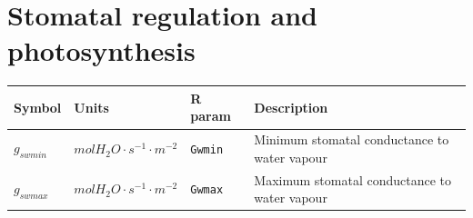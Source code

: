 \documentclass[]{book}
\begin{document}
\section{Stomatal regulation and
photosynthesis}\label{stomatal-regulation-and-photosynthesis-1}

\begin{longtable}[]{@{}llll@{}}
\toprule
\begin{minipage}[b]{0.11\columnwidth}\raggedright\strut
Symbol\strut
\end{minipage} & \begin{minipage}[b]{0.10\columnwidth}\raggedright\strut
Units\strut
\end{minipage} & \begin{minipage}[b]{0.12\columnwidth}\raggedright\strut
R param\strut
\end{minipage} & \begin{minipage}[b]{0.45\columnwidth}\raggedright\strut
Description\strut
\end{minipage}\tabularnewline
\midrule
\endhead
\begin{minipage}[t]{0.11\columnwidth}\raggedright\strut
\(g_{swmin}\)\strut
\end{minipage} & \begin{minipage}[t]{0.10\columnwidth}\raggedright\strut
\(mol H_2O \cdot s^{-1} \cdot m^{-2}\)\strut
\end{minipage} & \begin{minipage}[t]{0.12\columnwidth}\raggedright\strut
\texttt{Gwmin}\strut
\end{minipage} & \begin{minipage}[t]{0.45\columnwidth}\raggedright\strut
Minimum stomatal conductance to water vapour\strut
\end{minipage}\tabularnewline
\begin{minipage}[t]{0.11\columnwidth}\raggedright\strut
\(g_{swmax}\)\strut
\end{minipage} & \begin{minipage}[t]{0.10\columnwidth}\raggedright\strut
\(mol H_2O \cdot s^{-1} \cdot m^{-2}\)\strut
\end{minipage} & \begin{minipage}[t]{0.12\columnwidth}\raggedright\strut
\texttt{Gwmax}\strut
\end{minipage} & \begin{minipage}[t]{0.45\columnwidth}\raggedright\strut
Maximum stomatal conductance to water vapour\strut
\end{minipage}\tabularnewline

\end{longtable}
\end{document}
